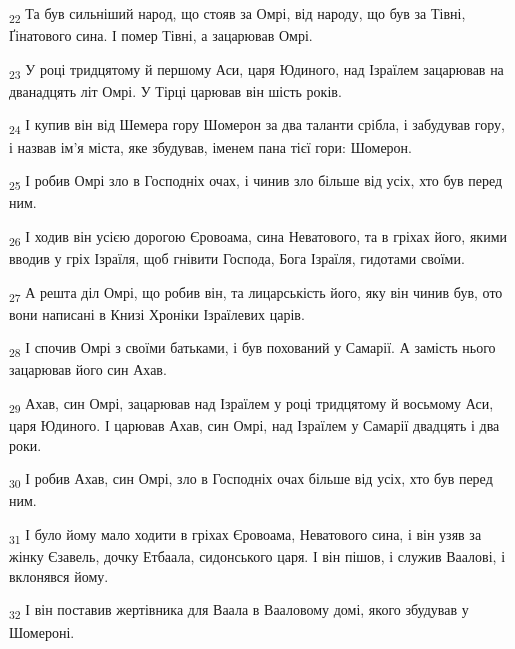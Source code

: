 \begin{tcolorbox}
\textsubscript{22} Та був сильніший народ, що стояв за Омрі, від народу, що був за Тівні, Ґінатового сина. І помер Тівні, а зацарював Омрі.
\end{tcolorbox}
\begin{tcolorbox}
\textsubscript{23} У році тридцятому й першому Аси, царя Юдиного, над Ізраїлем зацарював на дванадцять літ Омрі. У Тірці царював він шість років.
\end{tcolorbox}
\begin{tcolorbox}
\textsubscript{24} І купив він від Шемера гору Шомерон за два таланти срібла, і забудував гору, і назвав ім'я міста, яке збудував, іменем пана тієї гори: Шомерон.
\end{tcolorbox}
\begin{tcolorbox}
\textsubscript{25} І робив Омрі зло в Господніх очах, і чинив зло більше від усіх, хто був перед ним.
\end{tcolorbox}
\begin{tcolorbox}
\textsubscript{26} І ходив він усією дорогою Єровоама, сина Неватового, та в гріхах його, якими вводив у гріх Ізраїля, щоб гнівити Господа, Бога Ізраїля, гидотами своїми.
\end{tcolorbox}
\begin{tcolorbox}
\textsubscript{27} А решта діл Омрі, що робив він, та лицарськість його, яку він чинив був, ото вони написані в Книзі Хроніки Ізраїлевих царів.
\end{tcolorbox}
\begin{tcolorbox}
\textsubscript{28} І спочив Омрі з своїми батьками, і був похований у Самарії. А замість нього зацарював його син Ахав.
\end{tcolorbox}
\begin{tcolorbox}
\textsubscript{29} Ахав, син Омрі, зацарював над Ізраїлем у році тридцятому й восьмому Аси, царя Юдиного. І царював Ахав, син Омрі, над Ізраїлем у Самарії двадцять і два роки.
\end{tcolorbox}
\begin{tcolorbox}
\textsubscript{30} І робив Ахав, син Омрі, зло в Господніх очах більше від усіх, хто був перед ним.
\end{tcolorbox}
\begin{tcolorbox}
\textsubscript{31} І було йому мало ходити в гріхах Єровоама, Неватового сина, і він узяв за жінку Єзавель, дочку Етбаала, сидонського царя. І він пішов, і служив Ваалові, і вклонявся йому.
\end{tcolorbox}
\begin{tcolorbox}
\textsubscript{32} І він поставив жертівника для Ваала в Вааловому домі, якого збудував у Шомероні.
\end{tcolorbox}
